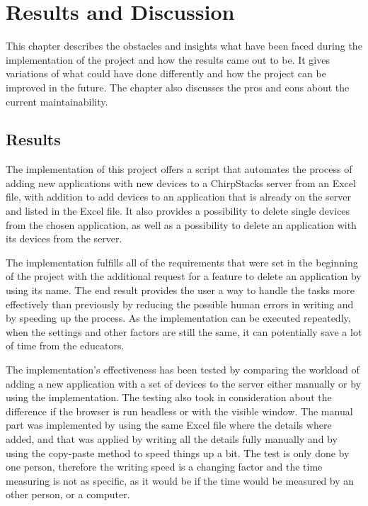 
\chapter{Results and Discussion} \label{ch:res_and_disc}

This chapter describes the obstacles and insights what have been faced during the implementation of the project and how the results came out to be.
It gives variations of what could have done differently and how the project can be improved in the future.
The chapter also discusses the pros and cons about the current maintainability.

\section{Results}
The implementation of this project offers a script that automates the process of adding new applications with new devices to a ChirpStacks server from an Excel file, with addition to add devices to an application that is already on the server and listed in the Excel file.
It also provides a possibility to delete single devices from the chosen application, as well as a possibility to delete an application with its devices from the server.

The implementation fulfills all of the requirements that were set in the beginning of the project with the additional request for a feature to delete an application by using its name.
The end result provides the user a way to handle the tasks more effectively than previously by reducing the possible human errors in writing and by speeding up the process.
As the implementation can be executed repeatedly, when the settings and other factors are still the same, it can potentially save a lot of time from the educators.

The implementation's effectiveness has been tested by comparing the workload of adding a new application with a set of devices to the server either manually or by using the implementation.
The testing also took in consideration about the difference if the browser is run headless or with the visible window.
The manual part was implemented by using the same Excel file where the details where added, and that was applied by writing all the details fully manually and by using the copy-paste method to speed things up a bit.
The test is only done by one person, therefore the writing speed is a changing factor and the time measuring is not as specific, as it would be if the time would be measured by an other person, or a computer.

